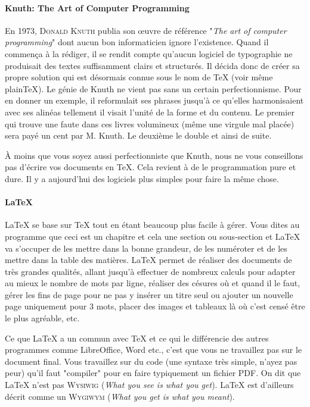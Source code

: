 \documentclass{../fiche}
\begin{document}
\vspace{-.4cm}

\paragraph{Knuth: The Art of Computer Programming}
En 1973, \textsc{Donald Knuth} publia son \oe uvre de référence "\textit{The art of computer programming}" dont aucun bon informaticien ignore l'existence. Quand il commença à la rédiger, il se rendit compte qu'aucun logiciel de typographie ne produisait des textes suffisamment clairs et structurés. Il décida donc de créer sa propre solution qui est désormais connue sous le nom de \TeX{} (voir même plain\TeX). Le génie de Knuth ne vient pas sans un certain perfectionnisme. Pour en donner un exemple, il reformulait ses phrases jusqu'à ce qu'elles harmonisaient avec ses alinéas tellement il visait l'unité de la forme et du contenu.
Le premier qui trouve une faute dans ces livres volumineux (même une virgule mal placée) sera payé un cent par M. Knuth. Le deuxième le double et ainsi de suite.

À moins que vous soyez aussi perfectionniste que Knuth, nous ne vous conseillons pas d'écrire vos documents en \TeX. Cela revient à de le programmation pure et dure. Il y a aujourd'hui des logiciels plus simples pour faire la même chose.

\paragraph{LaTeX}
\LaTeX{} se base sur \TeX{} tout en étant beaucoup plus facile à gérer. Vous dites au programme que ceci est un chapitre et cela une section ou sous-section et \LaTeX{} va s'occuper de les mettre dans la bonne grandeur, de les numéroter et de les mettre dans la table des matières. \LaTeX{} permet de réaliser des documents de très grandes qualités, allant jusqu'à effectuer de nombreux calculs pour adapter au mieux le nombre de mots par ligne, réaliser des césures où et quand il le faut, gérer les fins de page pour ne pas y insérer un titre seul ou ajouter un nouvelle page uniquement pour 3 mots, placer des images et tableaux là où c'est censé être le plus agréable, etc.

Ce que \LaTeX{} a un commun avec \TeX{} et ce qui le différencie des autres programmes comme LibreOffice, Word etc., c'est que vous ne travaillez pas sur le document final. Vous travaillez sur du code (une syntaxe très simple, n'ayez pas peur) qu'il faut "compiler" pour en faire typiquement un fichier PDF. On dit que \LaTeX{} n'est pas \textsc{Wysiwig} (\textit{What you see is what you get}). %
\LaTeX{} est d'ailleurs décrit comme un \textsc{Wygiwym} (\textit{What you get is what you meant}).
\end{document}
